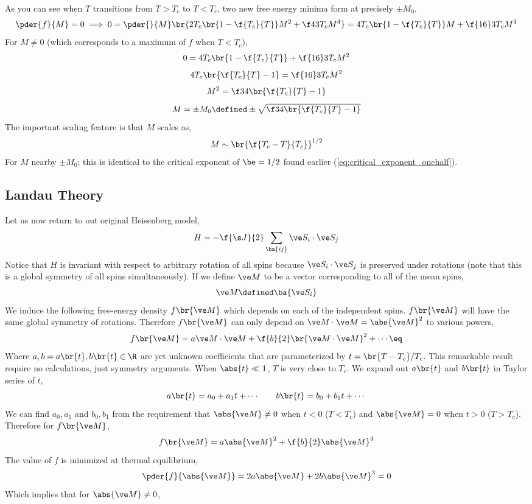\documentclass{article}
\begin{document}
As you can see when $T$ transitions from $T > T_c$ to $T < T_c$, two new free energy minima form at precisely $\pm M_0$.
\[ \pder{f}{M} = 0 \implies 0 = \pder{}{M}\br{2 T_c \br{1 - \f{T_c}{T}} M^2 + \f43 T_c M^4} = 4 T_c \br{1 - \f{T_c}{T}} M + \f{16}3 T_c M^3 \]
For $M \neq 0$ (which corresponds to a maximum of $f$ when $T < T_c$),
\[ 0 = 4 T_c \br{1 - \f{T_c}{T}} + \f{16}3 T_c M^2\]
\[ 4 T_c \br{\f{T_c}{T} - 1} = \f{16}3 T_c M^2\]
\[ M^2 = \f34\br{\f{T_c}{T} - 1}\]
\[ M = \pm M_0 \defined \pm \sqrt{\f34\br{\f{T_c}{T} - 1}}\]
The important scaling feature is that $M$ scales as,
\[ M \sim \br{\f{T_c - T}{T_c}}^{1/2} \]
For $M$ nearby $\pm M_0$; this is identical to the critical exponent of $\be = 1/2$ found earlier (\cref{eq:critical_exponent_onehalf}).

\subsection{Landau Theory}
Let us now return to out original Heisenberg model,
\[ H = - \f{\s J}{2}\sum_{\ba{ij}}\ve S_i \cdot \ve S_j \]
Notice that $H$ is invariant with respect to arbitrary rotation of all spins because $\ve S_i \cdot \ve S_j$ is preserved under rotations (note that this is a global symmetry of all spins simultaneously). If we define $\ve M$ to be a vector corresponding to all of the mean spins,
\[ \ve M \defined \ba{\ve S_i} \]
We induce the following free-energy density $f\br{\ve M}$ which depends on each of the independent spins. $f \br{\ve M}$ will have the same global symmetry of rotations. Therefore $f\br{\ve M}$ can only depend on $\ve M \cdot \ve M = \abs{\ve M}^2$ to various powers,
\[  f\br{\ve M} = a \ve M \cdot \ve M + \f{b}{2} \br{\ve M \cdot \ve M}^2 + \cdots \eq \label{eq:landau_theory_first}\]
Where $a, b = a\br{t}, b\br{t} \in \R$ are yet unknown coefficients that are parameterized by $t = \br{T-T_c}/T_c$. This remarkable result require no calculations, just symmetry arguments. When $\abs{t} \ll 1$, $T$ is very close to $T_c$. We expand out $a\br{t}$ and $b\br{t}$ in Taylor series of $t$,
\[ a\br{t} = a_0 + a_1 t + \cdots \qquad  b\br{t} = b_0 + b_1 t + \cdots \]
We can find $a_0, a_1$ and $b_0, b_1$ from the requirement that $\abs{\ve M} \neq 0$ when $t < 0$ ($T < T_c$) and $\abs{\ve M} = 0$ when $t > 0$ ($T > T_c$). Therefore for $f\br{\ve M}$,
\[ f\br{\ve M} = a \abs{\ve M}^2 + \f{b}{2}\abs{\ve M}^4 \]
The value of $f$ is minimized at thermal equilibrium,
\[ \pder{f}{\abs{\ve M}} = 2 a \abs{\ve M} + 2 b \abs{\ve M}^3 = 0 \]
Which implies that for $\abs{\ve M} \neq 0$,
\end{document}

